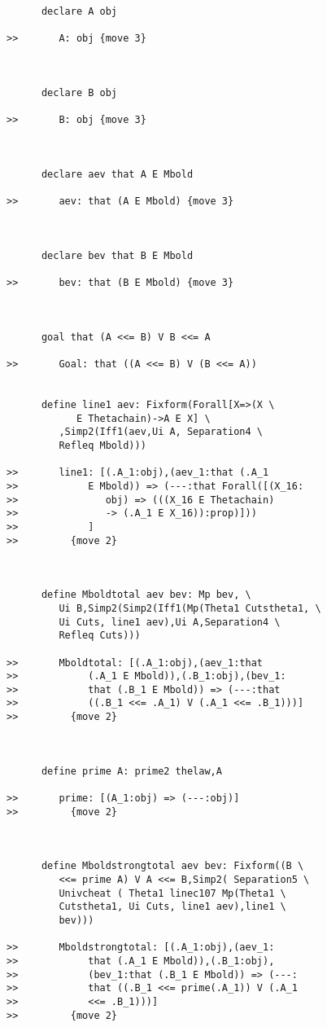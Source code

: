 \documentclass[12pt]{article}
\begin{document}
\begin{verbatim}
      declare A obj

>>       A: obj {move 3}



      declare B obj

>>       B: obj {move 3}



      declare aev that A E Mbold

>>       aev: that (A E Mbold) {move 3}



      declare bev that B E Mbold

>>       bev: that (B E Mbold) {move 3}



      goal that (A <<= B) V B <<= A

>>       Goal: that ((A <<= B) V (B <<= A))


      define line1 aev: Fixform(Forall[X=>(X \
            E Thetachain)->A E X] \
         ,Simp2(Iff1(aev,Ui A, Separation4 \
         Refleq Mbold)))

>>       line1: [(.A_1:obj),(aev_1:that (.A_1
>>            E Mbold)) => (---:that Forall([(X_16:
>>               obj) => (((X_16 E Thetachain)
>>               -> (.A_1 E X_16)):prop)]))
>>            ]
>>         {move 2}



      define Mboldtotal aev bev: Mp bev, \
         Ui B,Simp2(Simp2(Iff1(Mp(Theta1 Cutstheta1, \
         Ui Cuts, line1 aev),Ui A,Separation4 \
         Refleq Cuts)))

>>       Mboldtotal: [(.A_1:obj),(aev_1:that
>>            (.A_1 E Mbold)),(.B_1:obj),(bev_1:
>>            that (.B_1 E Mbold)) => (---:that
>>            ((.B_1 <<= .A_1) V (.A_1 <<= .B_1)))]
>>         {move 2}



      define prime A: prime2 thelaw,A

>>       prime: [(A_1:obj) => (---:obj)]
>>         {move 2}



      define Mboldstrongtotal aev bev: Fixform((B \
         <<= prime A) V A <<= B,Simp2( Separation5 \
         Univcheat ( Theta1 linec107 Mp(Theta1 \
         Cutstheta1, Ui Cuts, line1 aev),line1 \
         bev)))

>>       Mboldstrongtotal: [(.A_1:obj),(aev_1:
>>            that (.A_1 E Mbold)),(.B_1:obj),
>>            (bev_1:that (.B_1 E Mbold)) => (---:
>>            that ((.B_1 <<= prime(.A_1)) V (.A_1
>>            <<= .B_1)))]
>>         {move 2}




\end{verbatim}
\end{document}
